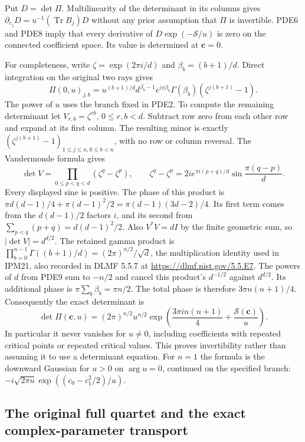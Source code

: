\documentclass[11pt,a4paper]{article}
\begin{document}
Put $D=\det\Pi$. Multilinearity of the determinant in its columns
gives $\partial_{c_j}D=u^{-1}(\operatorname{Tr}B_j)D$ without any
prior assumption that $\Pi$ is invertible. PDE6 and PDE8 imply that
every derivative of $D\exp(-\mathcal S/u)$ is zero on the connected
coefficient space. Its value is determined at $\mathbf c=0$.

For completeness, write $\zeta=\exp(2\pi i/d)$ and
$\beta_b=(b+1)/d$. Direct integration on the original two rays gives
\[
 \Pi(0,u)_{j,b}
  =u^{(b+1)/d}d^{\beta_b-1}
          e^{i\pi\beta_b}\Gamma(\beta_b)
                       (\zeta^{j(b+1)}-1).
 \tag{PDE9}
\]
The power of $u$ uses the branch fixed in PDE2. To compute the remaining
determinant let $V_{r,b}=\zeta^{rb}$, $0\leq r,b<d$. Subtract row zero
from each other row and expand at its first column. The resulting
minor is exactly $(\zeta^{j(b+1)}-1)_{1\leq j\leq n,0\leq b<n}$,
with no row or column reversal. The Vandermonde formula gives
\[
 \det V=\prod_{0\leq p<q<d}(\zeta^q-\zeta^p),\qquad
 \zeta^q-\zeta^p
       =2i e^{\pi i(p+q)/d}\sin\frac{\pi(q-p)}d.
 \tag{PDE10}
\]
Every displayed sine is positive. The phase of this product is
$\pi d(d-1)/4+\pi(d-1)^2/2
=\pi(d-1)(3d-2)/4$.
Its first term comes from the $d(d-1)/2$ factors $i$, and its second
from $\sum_{p<q}(p+q)=d(d-1)^2/2$.
Also $V^*V=dI$ by the finite geometric sum, so $|\det V|=d^{d/2}$.
The retained gamma product is
$\prod_{b=0}^{n-1}\Gamma((b+1)/d)=(2\pi)^{n/2}/\sqrt d$,
the multiplication identity used in IPM21, also recorded in DLMF
5.5.7 at \url{https://dlmf.nist.gov/5.5.E7}.
The powers of $d$ from PDE9 sum to $-n/2$ and cancel this product's
$d^{-1/2}$ against $d^{d/2}$. Its additional phase is
$\pi\sum_b\beta_b=\pi n/2$. The total phase is therefore
$3\pi n(n+1)/4$. Consequently the exact determinant is
\[
 \boxed{\displaystyle
 \det\Pi(\mathbf c,u)
   =(2\pi)^{n/2}u^{n/2}
       \exp\left(\frac{3\pi i n(n+1)}4
                         +\frac{\mathcal S(\mathbf c)}u\right).}
 \tag{PDE11}
\]
In particular it never vanishes for $u\ne0$, including coefficients
with repeated critical points or repeated critical values. This proves
invertibility rather than assuming it to use a determinant equation.
For $n=1$ the formula is the downward Gaussian for $u>0$ on
$\arg u=0$, continued on the specified branch:
$-i\sqrt{2\pi u}\exp((c_0-c_1^2/2)/u)$.

\subsection{The original full quartet and the exact complex-parameter transport}
\end{document}
